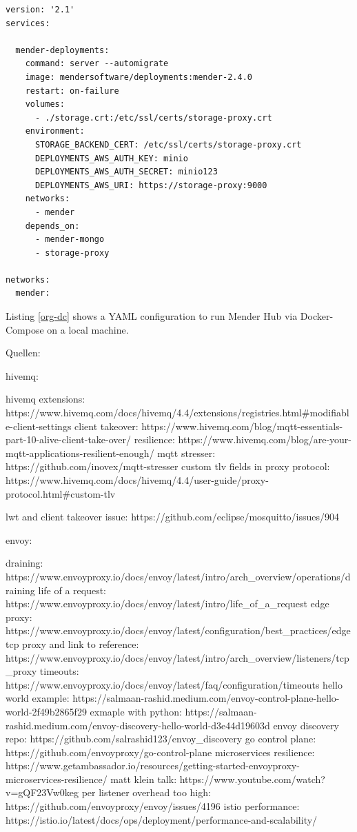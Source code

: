 \begin{code}
  \label{org-dc}
  \begin{verbatim}
version: '2.1'
services:

  mender-deployments:
    command: server --automigrate
    image: mendersoftware/deployments:mender-2.4.0
    restart: on-failure
    volumes:
      - ./storage.crt:/etc/ssl/certs/storage-proxy.crt
    environment:
      STORAGE_BACKEND_CERT: /etc/ssl/certs/storage-proxy.crt
      DEPLOYMENTS_AWS_AUTH_KEY: minio
      DEPLOYMENTS_AWS_AUTH_SECRET: minio123
      DEPLOYMENTS_AWS_URI: https://storage-proxy:9000
    networks:
      - mender
    depends_on:
      - mender-mongo
      - storage-proxy

networks:
  mender:
  \end{verbatim}
\end{code}
Listing \ref{org-dc} shows a YAML configuration to run Mender Hub via Docker-Compose on a local machine.

Quellen:

hivemq:

hivemq extensions: https://www.hivemq.com/docs/hivemq/4.4/extensions/registries.html#modifiable-client-settings
client takeover: https://www.hivemq.com/blog/mqtt-essentials-part-10-alive-client-take-over/
resilience: https://www.hivemq.com/blog/are-your-mqtt-applications-resilient-enough/
mqtt stresser: https://github.com/inovex/mqtt-stresser
custom tlv fields in proxy protocol: https://www.hivemq.com/docs/hivemq/4.4/user-guide/proxy-protocol.html#custom-tlv

lwt and client takeover issue: https://github.com/eclipse/mosquitto/issues/904

envoy:

draining: https://www.envoyproxy.io/docs/envoy/latest/intro/arch_overview/operations/draining
life of a request: https://www.envoyproxy.io/docs/envoy/latest/intro/life_of_a_request
edge proxy: https://www.envoyproxy.io/docs/envoy/latest/configuration/best_practices/edge
tcp proxy and link to reference: https://www.envoyproxy.io/docs/envoy/latest/intro/arch_overview/listeners/tcp_proxy
timeouts: https://www.envoyproxy.io/docs/envoy/latest/faq/configuration/timeouts
hello world example: https://salmaan-rashid.medium.com/envoy-control-plane-hello-world-2f49b2865f29
exmaple with python: https://salmaan-rashid.medium.com/envoy-discovery-hello-world-d3e44d19603d
envoy discovery repo: https://github.com/salrashid123/envoy_discovery
go control plane: https://github.com/envoyproxy/go-control-plane
microservices resilience: https://www.getambassador.io/resources/getting-started-envoyproxy-microservices-resilience/
matt klein talk: https://www.youtube.com/watch?v=gQF23Vw0keg
per listener overhead too high: https://github.com/envoyproxy/envoy/issues/4196
istio performance: https://istio.io/latest/docs/ops/deployment/performance-and-scalability/

